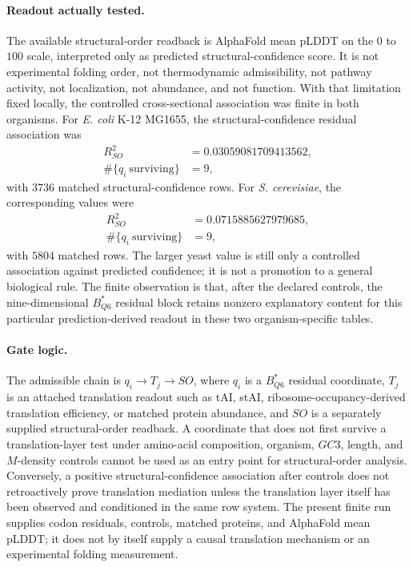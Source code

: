 \paragraph{Readout actually tested.}
The available structural-order readback is AlphaFold mean pLDDT on the $0$ to $100$ scale, interpreted only as predicted structural-confidence score. It is not experimental folding order, not thermodynamic admissibility, not pathway activity, not localization, not abundance, and not function. With that limitation fixed locally, the controlled cross-sectional association was finite in both organisms. For \emph{E. coli} K-12 MG1655, the structural-confidence residual association was
$$
\begin{aligned}
R^2_{SO} &= 0.03059081709413562,\\
\#\{q_i\ \mathrm{surviving}\} &= 9,
\end{aligned}
$$
with $3736$ matched structural-confidence rows. For \emph{S. cerevisiae}, the corresponding values were
$$
\begin{aligned}
R^2_{SO} &= 0.0715885627979685,\\
\#\{q_i\ \mathrm{surviving}\} &= 9,
\end{aligned}
$$
with $5804$ matched rows. The larger yeast value is still only a controlled association against predicted confidence; it is not a promotion to a general biological rule. The finite observation is that, after the declared controls, the nine-dimensional $B^*_{Q6}$ residual block retains nonzero explanatory content for this particular prediction-derived readout in these two organism-specific tables.

\paragraph{Gate logic.}
The admissible chain is $q_i\rightarrow T_j\rightarrow SO$, where $q_i$ is a $B^*_{Q6}$ residual coordinate, $T_j$ is an attached translation readout such as tAI, stAI, ribosome-occupancy-derived translation efficiency, or matched protein abundance, and $SO$ is a separately supplied structural-order readback. A coordinate that does not first survive a translation-layer test under amino-acid composition, organism, $GC3$, length, and $M$-density controls cannot be used as an entry point for structural-order analysis. Conversely, a positive structural-confidence association after controls does not retroactively prove translation mediation unless the translation layer itself has been observed and conditioned in the same row system. The present finite run supplies codon residuals, controls, matched proteins, and AlphaFold mean pLDDT; it does not by itself supply a causal translation mechanism or an experimental folding measurement.

